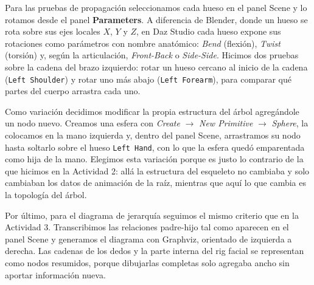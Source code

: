 Para las pruebas de propagación seleccionamos cada hueso en el panel Scene y lo rotamos desde el panel \textbf{Parameters}. A diferencia de Blender, donde un hueso se rota sobre sus ejes locales $X$, $Y$ y $Z$, en Daz Studio cada hueso expone sus rotaciones como parámetros con nombre anatómico: \textit{Bend} (flexión), \textit{Twist} (torsión) y, según la articulación, \textit{Front-Back} o \textit{Side-Side}. Hicimos dos pruebas sobre la cadena del brazo izquierdo: rotar un hueso cercano al inicio de la cadena (\texttt{Left Shoulder}) y rotar uno más abajo (\texttt{Left Forearm}), para comparar qué partes del cuerpo arrastra cada uno.

Como variación decidimos modificar la propia estructura del árbol agregándole un nodo nuevo. Creamos una esfera con \textit{Create} $\to$ \textit{New Primitive} $\to$ \textit{Sphere}, la colocamos en la mano izquierda y, dentro del panel Scene, arrastramos su nodo hasta soltarlo sobre el hueso \texttt{Left Hand}, con lo que la esfera quedó emparentada como hija de la mano. Elegimos esta variación porque es justo lo contrario de la que hicimos en la Actividad 2: allá la estructura del esqueleto no cambiaba y solo cambiaban los datos de animación de la raíz, mientras que aquí lo que cambia es la topología del árbol.

Por último, para el diagrama de jerarquía seguimos el mismo criterio que en la Actividad 3. Transcribimos las relaciones padre-hijo tal como aparecen en el panel Scene y generamos el diagrama con Graphviz, orientado de izquierda a derecha. Las cadenas de los dedos y la parte interna del rig facial se representan como nodos resumidos, porque dibujarlas completas solo agregaba ancho sin aportar información nueva.
